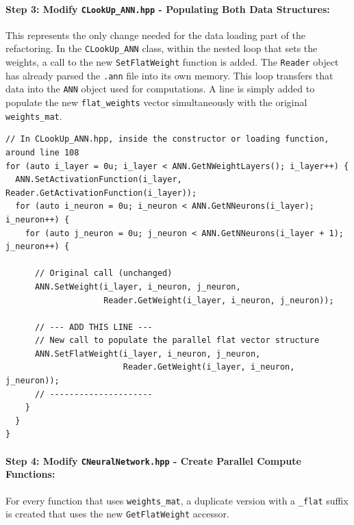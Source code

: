 \documentclass{article}
\begin{document}
\paragraph{Step 3: Modify \texttt{CLookUp\_ANN.hpp} - Populating Both Data Structures:}

This represents the only change needed for the data loading part of the refactoring. In the \texttt{CLookUp\_ANN} class, within the nested loop that sets the weights, a call to the new \texttt{SetFlatWeight} function is added. The \texttt{Reader} object has already parsed the \texttt{.ann} file into its own memory. This loop transfers that data into the \texttt{ANN} object used for computations. A line is simply added to populate the new \texttt{flat\_weights} vector simultaneously with the original \texttt{weights\_mat}.

\begin{verbatim}
// In CLookUp_ANN.hpp, inside the constructor or loading function, around line 108
for (auto i_layer = 0u; i_layer < ANN.GetNWeightLayers(); i_layer++) {
  ANN.SetActivationFunction(i_layer, Reader.GetActivationFunction(i_layer));
  for (auto i_neuron = 0u; i_neuron < ANN.GetNNeurons(i_layer); i_neuron++) {
    for (auto j_neuron = 0u; j_neuron < ANN.GetNNeurons(i_layer + 1); j_neuron++) {
      
      // Original call (unchanged)
      ANN.SetWeight(i_layer, i_neuron, j_neuron,
                    Reader.GetWeight(i_layer, i_neuron, j_neuron));

      // --- ADD THIS LINE ---
      // New call to populate the parallel flat vector structure
      ANN.SetFlatWeight(i_layer, i_neuron, j_neuron,
                        Reader.GetWeight(i_layer, i_neuron, j_neuron));
      // ---------------------
    }
  }
}
\end{verbatim}

\paragraph{Step 4: Modify \texttt{CNeuralNetwork.hpp} - Create Parallel Compute Functions:}

For every function that uses \texttt{weights\_mat}, a duplicate version with a \texttt{\_flat} suffix is created that uses the new \texttt{GetFlatWeight} accessor.
\end{document}
